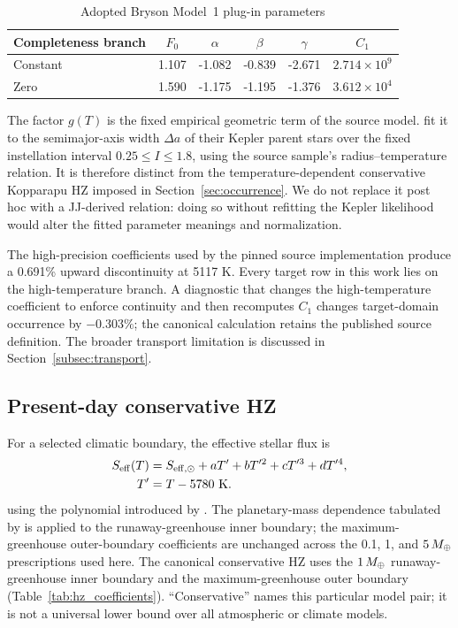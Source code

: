 \begin{table}[t]
\caption{Adopted Bryson Model~1 plug-in parameters}
\label{tab:occurrence_parameters}
\centering
\begin{tabular}{lccccc}
\toprule
Completeness branch & $F_0$ & $\alpha$ & $\beta$ & $\gamma$ & $C_1$\\
\midrule
Constant & 1.107 & -1.082 & -0.839 & -2.671 & $2.714\times10^9$\\
Zero & 1.590 & -1.175 & -1.195 & -1.376 & $3.612\times10^4$\\
\bottomrule
\end{tabular}
\end{table}

The factor $g(T)$ is the fixed empirical geometric term of the source model. \citet{Bryson2021} fit it to the semimajor-axis width $\Delta a$ of their Kepler parent stars over the fixed instellation interval $0.25\leq I\leq1.8$, using the source sample's radius--temperature relation. It is therefore distinct from the temperature-dependent conservative Kopparapu HZ imposed in Section~\ref{sec:occurrence}. We do not replace it post hoc with a JJ-derived relation: doing so without refitting the Kepler likelihood would alter the fitted parameter meanings and normalization.

The high-precision coefficients used by the pinned source implementation produce a 0.691\% upward discontinuity at 5117 K. Every target row in this work lies on the high-temperature branch. A diagnostic that changes the high-temperature coefficient to enforce continuity and then recomputes $C_1$ changes target-domain occurrence by $-0.303\%$; the canonical calculation retains the published source definition. The broader transport limitation is discussed in Section~\ref{subsec:transport}.

\subsection{Present-day conservative HZ}

For a selected climatic boundary, the effective stellar flux is
\begin{align}
 S_{\rm eff}(T)={}&S_{{\rm eff},\odot}+aT'
 +bT'^2+cT'^3+dT'^4,\nonumber\\
 T'={}&T-5780\ {\rm K}.
 \label{eq:kopparapu}
\end{align}
using the polynomial introduced by \citet{Kopparapu2013}. The planetary-mass dependence tabulated by \citet{Kopparapu2014} is applied to the runaway-greenhouse inner boundary; the maximum-greenhouse outer-boundary coefficients are unchanged across the 0.1, 1, and $5\,M_{\oplus}$ prescriptions used here. The canonical conservative HZ uses the $1\,M_{\oplus}$ runaway-greenhouse inner boundary and the maximum-greenhouse outer boundary (Table~\ref{tab:hz_coefficients}). ``Conservative'' names this particular model pair; it is not a universal lower bound over all atmospheric or climate models.

